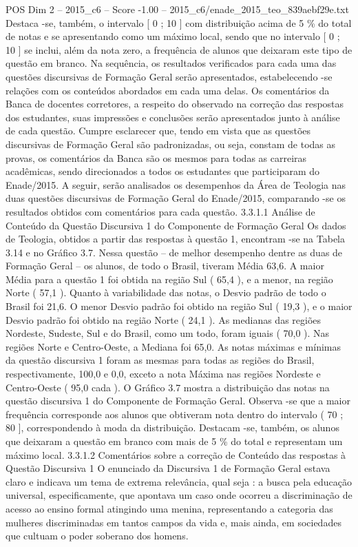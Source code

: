 \begin{textsample}{POS Dim 2 – 2015\_c6 – Score -1.00 – 2015\_c6/enade\_2015\_teo\_839aebf29e.txt}
Destaca -se, também, o intervalo [ 0 ; 10 ] com distribuição acima de 5 \% do total de notas e se apresentando como um máximo local, sendo que no intervalo [ 0 ; 10 ] se inclui, além da nota zero, a frequência de alunos que deixaram este tipo de questão em branco.
Na sequência, os resultados verificados para cada uma das questões discursivas de Formação Geral serão apresentados, estabelecendo -se relações com os conteúdos abordados em cada uma delas.
Os comentários da Banca de docentes corretores, a respeito do observado na correção das respostas dos estudantes, suas impressões e conclusões serão apresentados junto à análise de cada questão.
Cumpre esclarecer que, tendo em vista que as questões discursivas de Formação Geral são padronizadas, ou seja, constam de todas as provas, os comentários da Banca são os mesmos para todas as carreiras acadêmicas, sendo direcionados a todos os estudantes que participaram do Enade/2015.
A seguir, serão analisados os desempenhos da Área de Teologia nas duas questões discursivas de Formação Geral do Enade/2015, comparando -se os resultados obtidos com comentários para cada questão. 3.3.1.1 Análise de Conteúdo da Questão Discursiva 1 do Componente de Formação Geral Os dados de Teologia, obtidos a partir das respostas à questão 1, encontram -se na Tabela 3.14 e no Gráfico 3.7.
Nessa questão – de melhor desempenho dentre as duas de Formação Geral – os alunos, de todo o Brasil, tiveram Média 63,6.
A maior Média para a questão 1 foi obtida na região Sul ( 65,4 ), e a menor, na região Norte ( 57,1 ).
Quanto à variabilidade das notas, o Desvio padrão de todo o Brasil foi 21,6.
O menor Desvio padrão foi obtido na região Sul ( 19,3 ), e o maior Desvio padrão foi obtido na região Norte ( 24,1 ).
As medianas das regiões Nordeste, Sudeste, Sul e do Brasil, como um todo, foram iguais ( 70,0 ).
Nas regiões Norte e Centro-Oeste, a Mediana foi 65,0.
As notas máximas e mínimas da questão discursiva 1 foram as mesmas para todas as regiões do Brasil, respectivamente, 100,0 e 0,0, exceto a nota Máxima nas regiões Nordeste e Centro-Oeste ( 95,0 cada ).
O Gráfico 3.7 mostra a distribuição das notas na questão discursiva 1 do Componente de Formação Geral.
Observa -se que a maior frequência corresponde aos alunos que obtiveram nota dentro do intervalo ( 70 ; 80 ], correspondendo à moda da distribuição.
Destacam -se, também, os alunos que deixaram a questão em branco com mais de 5 \% do total e representam um máximo local. 3.3.1.2 Comentários sobre a correção de Conteúdo das respostas à Questão Discursiva 1 O enunciado da Discursiva 1 de Formação Geral estava claro e indicava um tema de extrema relevância, qual seja : a busca pela educação universal, especificamente, que apontava um caso onde ocorreu a discriminação de acesso ao ensino formal atingindo uma menina, representando a categoria das mulheres discriminadas em tantos campos da vida e, mais ainda, em sociedades que cultuam o poder soberano dos homens.

\end{textsample}
